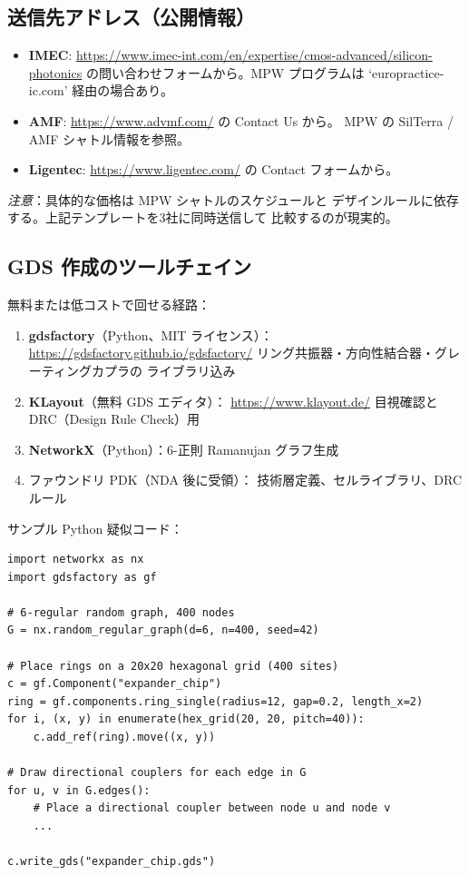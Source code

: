 \documentclass[11pt,a4paper]{article}
\begin{document}
\subsection{送信先アドレス（公開情報）}

\begin{itemize}[leftmargin=2em]
  \item \textbf{IMEC}: \url{https://www.imec-int.com/en/expertise/cmos-advanced/silicon-photonics}
        の問い合わせフォームから。MPW プログラムは `europractice-ic.com'
        経由の場合あり。
  \item \textbf{AMF}: \url{https://www.advmf.com/} の Contact Us から。
        MPW の SilTerra / AMF シャトル情報を参照。
  \item \textbf{Ligentec}: \url{https://www.ligentec.com/} の
        Contact フォームから。
\end{itemize}

\textit{注意}：具体的な価格は MPW シャトルのスケジュールと
デザインルールに依存する。上記テンプレートを3社に同時送信して
比較するのが現実的。

\subsection{GDS 作成のツールチェイン}

無料または低コストで回せる経路：

\begin{enumerate}[leftmargin=2em]
  \item \textbf{gdsfactory}（Python、MIT ライセンス）：
        \url{https://gdsfactory.github.io/gdsfactory/}
        リング共振器・方向性結合器・グレーティングカプラの
        ライブラリ込み
  \item \textbf{KLayout}（無料 GDS エディタ）：
        \url{https://www.klayout.de/}
        目視確認と DRC（Design Rule Check）用
  \item \textbf{NetworkX}（Python）：6-正則 Ramanujan グラフ生成
  \item ファウンドリ PDK（NDA 後に受領）：
        技術層定義、セルライブラリ、DRC ルール
\end{enumerate}

サンプル Python 疑似コード：
\begin{verbatim}
import networkx as nx
import gdsfactory as gf

# 6-regular random graph, 400 nodes
G = nx.random_regular_graph(d=6, n=400, seed=42)

# Place rings on a 20x20 hexagonal grid (400 sites)
c = gf.Component("expander_chip")
ring = gf.components.ring_single(radius=12, gap=0.2, length_x=2)
for i, (x, y) in enumerate(hex_grid(20, 20, pitch=40)):
    c.add_ref(ring).move((x, y))

# Draw directional couplers for each edge in G
for u, v in G.edges():
    # Place a directional coupler between node u and node v
    ...

c.write_gds("expander_chip.gds")
\end{verbatim}
\end{document}
